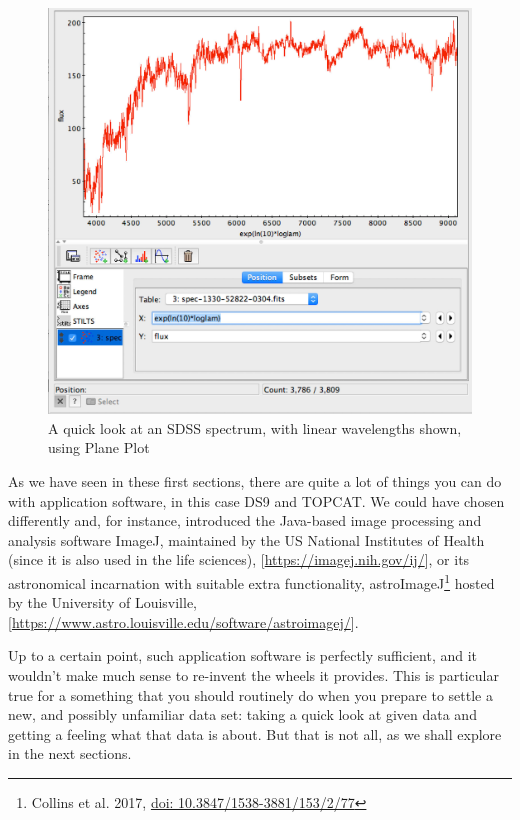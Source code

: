 \documentclass[twocolumn,apj]{openjournal}
\begin{document}
\begin{figure}[htbp]
\begin{center}
\includegraphics[width=\linewidth]{spectrumQuickLookLambda.jpg}
\caption{A quick look at an SDSS spectrum, with linear wavelengths shown, using Plane Plot}
\label{SpectrumQuickLookLambda}
\end{center}
\end{figure}

As we have seen in these first sections, there are quite a lot of things you can do with application software, in this case DS9 and TOPCAT. We could have chosen differently and, for instance, introduced the Java-based image processing and analysis software ImageJ, maintained by the US National Institutes of Health (since it is also used in the life sciences), [\href{https://imagej.nih.gov/ij/}{https://imagej.nih.gov/ij/}], or its astronomical incarnation with suitable extra functionality, astroImageJ\footnote{Collins et al. 2017, \href{https://doi.org/10.3847/1538-3881/153/2/77}{doi: 10.3847/1538-3881/153/2/77}} hosted by the University of Louisville, [\href{https://www.astro.louisville.edu/software/astroimagej/}{https://www.astro.louisville.edu/software/astroimagej/}].

Up to a certain point, such application software is perfectly sufficient, and it wouldn't make much sense to re-invent the wheels it provides. This is particular true for a something that you should routinely do when you prepare to settle a new, and possibly unfamiliar data set: taking a quick look at given data and getting a feeling what that data is about. But that is not all, as we shall explore in the next sections.
\end{document}
